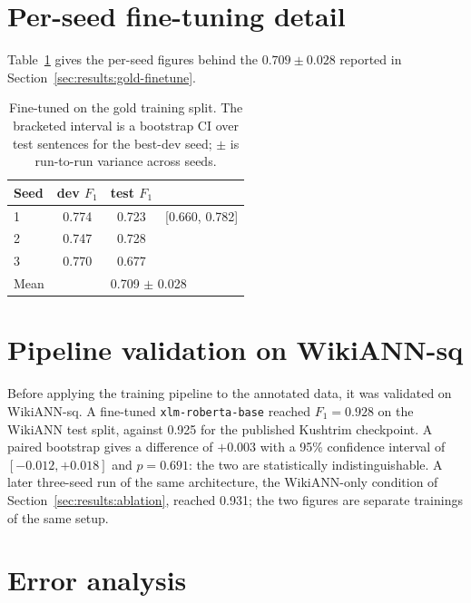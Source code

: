 \FloatBarrier

\section{Per-seed fine-tuning detail}
\label{app:finetune}

Table~\ref{tab:gold-finetune} gives the per-seed figures behind the $0.709 \pm 0.028$ reported in Section~\ref{sec:results:gold-finetune}.

\begin{table}[htbp]
\centering
\caption{Fine-tuned on the gold training split. The bracketed interval is a bootstrap CI
over test sentences for the best-dev seed; $\pm$ is run-to-run variance across seeds.}
\label{tab:gold-finetune}
\begin{tabular}{lccc}
\toprule
Seed & dev $F_1$ & test $F_1$ & \\
\midrule
1 & 0.774 & 0.723 & [0.660, 0.782] \\
2 & 0.747 & 0.728 & \\
3 & 0.770 & 0.677 & \\
\midrule
Mean & & \multicolumn{2}{l}{0.709 $\pm$ 0.028} \\
\bottomrule
\end{tabular}
\end{table}

\FloatBarrier

\section{Pipeline validation on WikiANN-sq}
\label{app:validation}

Before applying the training pipeline to the annotated data, it was validated on WikiANN-sq. A fine-tuned \texttt{xlm-roberta-base} reached $F_1 = 0.928$ on the WikiANN test split, against 0.925 for the published Kushtrim checkpoint. A paired bootstrap gives a difference of $+0.003$ with a 95\% confidence interval of $[-0.012, +0.018]$ and $p = 0.691$: the two are statistically indistinguishable. A later three-seed run of the same architecture, the WikiANN-only condition of Section~\ref{sec:results:ablation}, reached 0.931; the two figures are separate trainings of the same setup.

\FloatBarrier

\section{Error analysis}
\label{app:erroranalysis}

